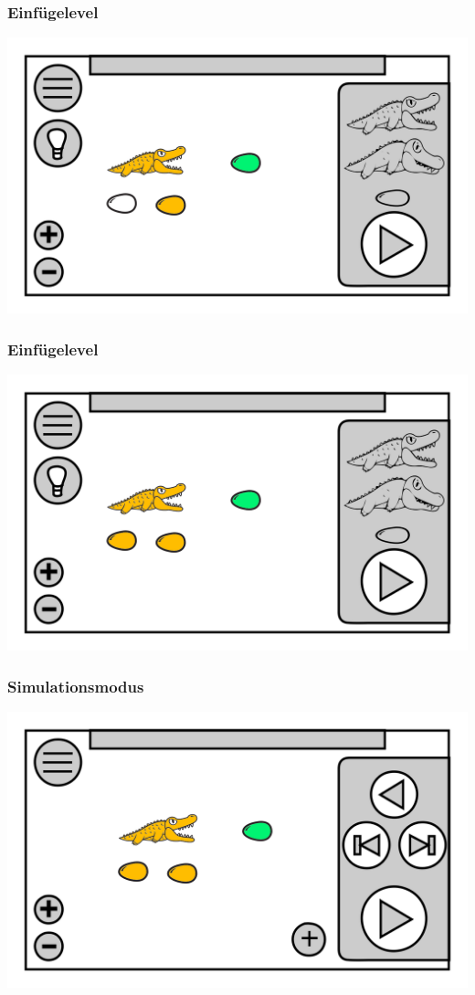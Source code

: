 \documentclass[t]{beamer}
\begin{document}
\begin{frame}
	\frametitle{Einfügelevel}
	\includegraphics[height=\textheight]{level_colored_croc1.png}
\end{frame}
\begin{frame}
	\frametitle{Einfügelevel}
	\includegraphics[height=\textheight]{level_colored_croc2.png}
\end{frame}
\begin{frame}
	\frametitle{Simulationsmodus}
	\includegraphics[height=\textheight]{level_simulation_croc.png}
\end{frame}
\end{document}
